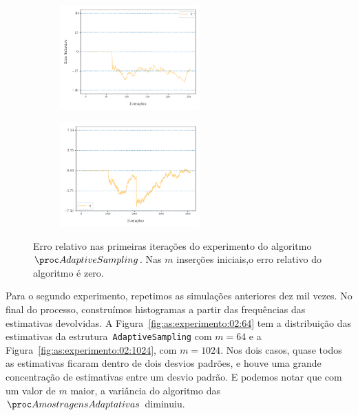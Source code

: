 \begin{figure}
  \centering
  \begin{subfigure}{.5\textwidth}
    \centering
    \includegraphics[width=\linewidth, height=4cm]{figuras/adaptive_sampling_erro_first_64.png}
  \end{subfigure}%
  \begin{subfigure}{.5\textwidth}
    \centering
    \includegraphics[width=\linewidth, height=4cm]{figuras/adaptive_sampling_erro_first_1024.png}
  \end{subfigure}
  \caption{Erro relativo nas primeiras iterações do experimento do algoritmo~$\AS$. Nas $m$ inserções iniciais,o erro 
  relativo do algoritmo é zero.}
  \label{fig:as:experimento:01:erro:first}
\end{figure}

Para o segundo experimento, repetimos as simulações anteriores dez mil vezes. No final do processo, construímos 
histogramas a partir das frequências das estimativas devolvidas. A Figura~\ref{fig:as:experimento:02:64} tem a 
distribuição das estimativas da estrutura~\texttt{AdaptiveSampling} com $m = 64$ e a 
Figura~\ref{fig:as:experimento:02:1024}, com $m = 1024$. Nos dois casos, quase todos as estimativas ficaram dentro de
dois desvios padrões, e houve uma grande concentração de estimativas entre um desvio padrão. E podemos notar que com um
valor de $m$ maior, a variância do algoritmo das $\asampling$ diminuiu.

